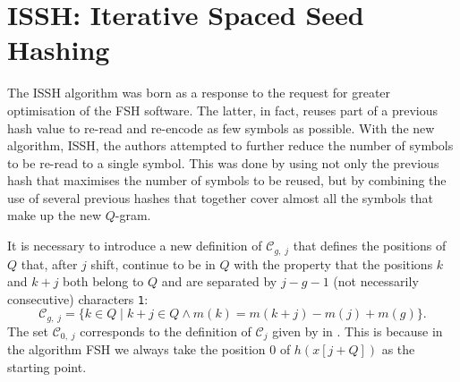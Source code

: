 \section{ISSH: Iterative Spaced Seed Hashing}
\label{sec:ISSH}

The \acs{ISSH} algorithm \cite{petrucci2020issh} was born as a response to the request for greater optimisation of the \acs{FSH} software. The latter, in fact, reuses part of a previous hash value to re-read and re-encode as few symbols as possible. With the new algorithm, \acs{ISSH}, the authors attempted to further reduce the number of symbols to be re-read to a single symbol. This was done by using not only the previous hash that maximises the number of symbols to be reused, but by combining the use of several previous hashes that together cover almost all the symbols that make up the new $Q$-gram.

It is necessary to introduce a new definition of $\mathcal{C}_{g,\; j}$ that defines the positions of $Q$ that, after $j$ shift, continue to be in $Q$ with the property that the positions $k$ and $k + j$ both belong to $Q$ and are separated by $j - g - 1$ (not necessarily consecutive) characters \texttt{1}: \[ \mathcal{C}_{g,\; j} = \{ k \in Q \;|\; k + j \in Q \wedge m(k) = m(k + j) - m(j) + m(g) \}. \] The set $\mathcal{C}_{0,\; j}$ corresponds to the definition of $\mathcal{C}_j$ given by \citeauthor*{girotto2018fsh} in  \cite{girotto2018fsh}. This is because in the algorithm \acs{FSH} we always take the position $0$ of $h(x[j + Q])$ as the starting point.

